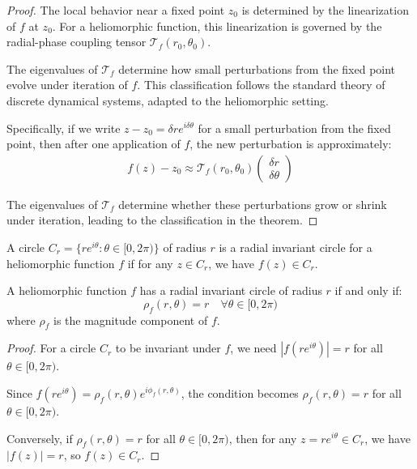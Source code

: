 \begin{proof}
The local behavior near a fixed point $z_0$ is determined by the linearization of $f$ at $z_0$. For a heliomorphic function, this linearization is governed by the radial-phase coupling tensor $\mathcal{T}_f(r_0,\theta_0)$.

The eigenvalues of $\mathcal{T}_f$ determine how small perturbations from the fixed point evolve under iteration of $f$. This classification follows the standard theory of discrete dynamical systems, adapted to the heliomorphic setting.

Specifically, if we write $z - z_0 = \delta r e^{i \delta \theta}$ for a small perturbation from the fixed point, then after one application of $f$, the new perturbation is approximately:
\begin{align}
f(z) - z_0 \approx \mathcal{T}_f(r_0,\theta_0) \begin{pmatrix} \delta r \\ \delta \theta \end{pmatrix}
\end{align}

The eigenvalues of $\mathcal{T}_f$ determine whether these perturbations grow or shrink under iteration, leading to the classification in the theorem.
\end{proof}

\begin{definition}
A circle $C_r = \{re^{i\theta} : \theta \in [0, 2\pi)\}$ of radius $r$ is a radial invariant circle for a heliomorphic function $f$ if for any $z \in C_r$, we have $f(z) \in C_r$.
\end{definition}

\begin{theorem}
A heliomorphic function $f$ has a radial invariant circle of radius $r$ if and only if:
\begin{equation}
\rho_f(r,\theta) = r \quad \forall \theta \in [0, 2\pi)
\end{equation}
where $\rho_f$ is the magnitude component of $f$.
\end{theorem}

\begin{proof}
For a circle $C_r$ to be invariant under $f$, we need $|f(re^{i\theta})| = r$ for all $\theta \in [0, 2\pi)$.

Since $f(re^{i\theta}) = \rho_f(r,\theta)e^{i\phi_f(r,\theta)}$, the condition becomes $\rho_f(r,\theta) = r$ for all $\theta \in [0, 2\pi)$.

Conversely, if $\rho_f(r,\theta) = r$ for all $\theta \in [0, 2\pi)$, then for any $z = re^{i\theta} \in C_r$, we have $|f(z)| = r$, so $f(z) \in C_r$.
\end{proof}

